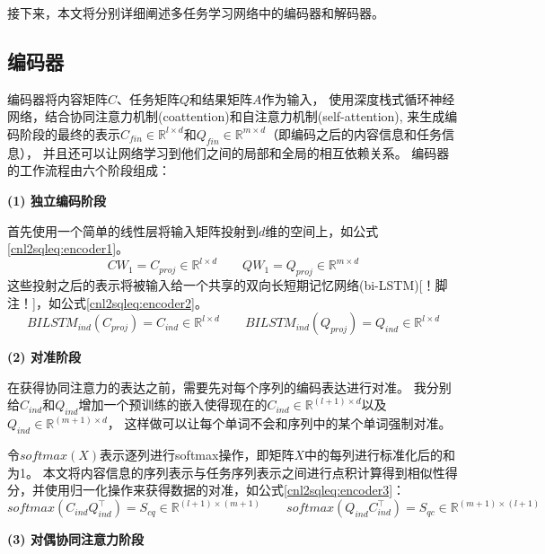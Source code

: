 接下来，本文将分别详细阐述多任务学习网络中的编码器和解码器。

\subsection{编码器}
\label{cnl2sql:encoder}

编码器将内容矩阵$C$、任务矩阵$Q$和结果矩阵$A$作为输入，
使用深度栈式循环神经网络，结合协同注意力机制(coattention)和自注意力机制(self-attention),
来生成编码阶段的最终的表示$C_{fin} \in \mathbb{R}^{l \times d}$和$Q_{fin} \in \mathbb{R}^{m \times d}$（即编码之后的内容信息和任务信息），
并且还可以让网络学习到他们之间的局部和全局的相互依赖关系。
编码器的工作流程由六个阶段组成：

\textbf{(1) 独立编码阶段}

首先使用一个简单的线性层将输入矩阵投射到$d$维的空间上，如公式\ref{cnl2sqleq:encoder1}。
\begin{equation}
    \label{cnl2sqleq:encoder1}
    CW_1 = C_{proj} \in \mathbb{R}^{l \times d} \qquad QW_1 = Q_{proj} \in \mathbb{R}^{m \times d} 
  \end{equation}
这些投射之后的表示将被输入给一个共享的双向长短期记忆网络(bi-LSTM)\cite{hochreiter1997long,graves2005framewise}[！脚注！]，如公式\ref{cnl2sqleq:encoder2}。
\begin{equation}
    \label{cnl2sqleq:encoder2}
    BILSTM_{ind}(C_{proj}) = C_{ind} \in \mathbb{R}^{l \times d} \qquad BILSTM_{ind}(Q_{proj}) = Q_{ind} \in \mathbb{R}^{l \times d}
\end{equation}

\textbf{(2) 对准阶段}

在获得协同注意力的表达之前，需要先对每个序列的编码表达进行对准。
我分别给$C_{ind}$和$Q_{ind}$增加一个预训练的嵌入使得现在的$C_{ind} \in \mathbb{R}^{(l+1) \times d}$以及$Q_{ind} \in \mathbb{R}^{(m+1) \times d}$，
这样做可以让每个单词不会和序列中的某个单词强制对准。

令$softmax(X)$表示逐列进行softmax操作，即矩阵$X$中的每列进行标准化后的和为1。
本文将内容信息的序列表示与任务序列表示之间进行点积计算得到相似性得分，并使用归一化操作来获得数据的对准，如公式\ref{cnl2sqleq:encoder3}：
\begin{equation}
  \label{cnl2sqleq:encoder3}
  softmax(C_{ind}Q_{ind}^{\top}) = S_{cq} \in \mathbb{R}^{(l+1) \times (m+1)} \qquad softmax(Q_{ind}C_{ind}^{\top}) = S_{qc} \in \mathbb{R}^{(m+1) \times (l+1)}
\end{equation}

\textbf{(3) 对偶协同注意力阶段}

